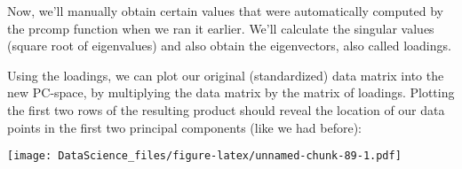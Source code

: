 \documentclass[
]{book}
\newenvironment{Shaded}{\begin{snugshade}}{\end{snugshade}}
\newcommand{\AttributeTok}[1]{\textcolor[rgb]{0.77,0.63,0.00}{#1}}
\newcommand{\FunctionTok}[1]{\textcolor[rgb]{0.00,0.00,0.00}{#1}}
\newcommand{\NormalTok}[1]{#1}
\newcommand{\OtherTok}[1]{\textcolor[rgb]{0.56,0.35,0.01}{#1}}
\newcommand{\SpecialCharTok}[1]{\textcolor[rgb]{0.00,0.00,0.00}{#1}}
\newcommand{\StringTok}[1]{\textcolor[rgb]{0.31,0.60,0.02}{#1}}
\begin{document}
Now, we'll manually obtain certain values that were automatically computed by the prcomp function when we ran it earlier. We'll calculate the singular values (square root of eigenvalues) and also obtain the eigenvectors, also called loadings.

\begin{Shaded}
\end{Shaded}

Using the loadings, we can plot our original (standardized) data matrix into the new PC-space, by multiplying the data matrix by the matrix of loadings. Plotting the first two rows of the resulting product should reveal the location of our data points in the first two principal components (like we had before):

\begin{Shaded}
\end{Shaded}

\texttt{[image: DataScience\_files/figure-latex/unnamed-chunk-89-1.pdf]}
\end{document}
